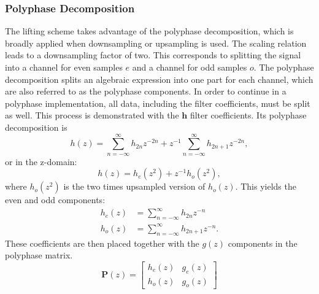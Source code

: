 \begin{refsection}
\subsubsection{Polyphase Decomposition \label{fpga:polyphase}}

The lifting scheme takes advantage of the polyphase decomposition, which is broadly applied when downsampling or upsampling is used. 
The scaling relation leads to a downsampling factor of two.
This corresponds to splitting the signal into a channel for even samples $e$ and a channel for odd samples $o$.
The polyphase decomposition splits an algebraic expression into one part for each channel, which are also referred to as the polyphase components.
In order to continue in a polyphase implementation, all data, including the filter coefficients, must be split as well.
This process is demonstrated with the $\bm h$ filter coefficients.
Its polyphase decomposition is
\begin{equation}
	h(z) = \sum_{n=-\infty}^{\infty} h_{2n} z^{-2n} + z^{-1} \sum_{n=-\infty}^{\infty} h_{2n+1} z^{-2n},
\end{equation}
or in the z-domain:
\begin{equation}
	h(z)=h_{e}(z^2) + z^{-1} h_o(z^2),
\end{equation}
where $h_o(z^2)$ is the two times upsampled version of $h_o(z)$.
This yields the even and odd components:
\begin{align}
	h_e(z) &= \sum_{n=-\infty}^{\infty} h_{2n} z^{-n}
	\\
	h_o(z) &= \sum_{n=-\infty}^{\infty} h_{2n+1} z^{-n}.
\end{align}
These coefficients are then placed together with the $g(z)$ components in the polyphase matrix.
\begin{equation}
	\bm P(z) = 
	\begin{bmatrix}
	h_e(z) & g_e(z) \\
	h_o(z) & g_o(z)
	\end{bmatrix}
\end{equation}


\end{refsection}
